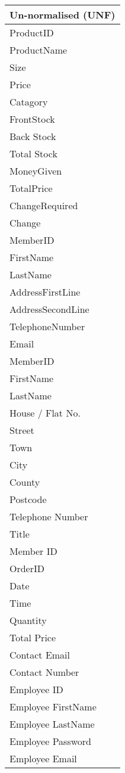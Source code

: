 \begin{center}
    \begin{tabular}{|p{4cm}|}
        \hline
        \textbf{Un-normalised (UNF)}\\ \hline
	{ProductID}\\ \hline
	{ProductName}\\ \hline
	{Size}\\ \hline
	{Price}\\ \hline
	{Catagory}\\ \hline
	{FrontStock}\\ \hline
	{Back Stock}\\ \hline
	{Total Stock}\\ \hline
	{MoneyGiven}\\ \hline
	{TotalPrice}\\ \hline
	{ChangeRequired}\\ \hline
	{Change}\\ \hline
	{MemberID}\\ \hline
	{FirstName}\\ \hline
	{LastName}\\ \hline
	{AddressFirstLine}\\ \hline
	{AddressSecondLine}\\ \hline
	{TelephoneNumber}\\ \hline
	{Email}\\ \hline
	{MemberID}\\ \hline
	{FirstName}\\ \hline
	{LastName}\\ \hline
	{House / Flat No.}\\ \hline
	{Street}\\ \hline
	{Town}\\ \hline
	{City}\\ \hline
	{County}\\ \hline
	{Postcode}\\ \hline
	{Telephone Number}\\ \hline
	{Title}\\ \hline
	{Member ID}\\ \hline
	{OrderID}\\ \hline
	{Date}\\ \hline
	{Time}\\ \hline
	{Quantity}\\ \hline
	{Total Price}\\ \hline
	{Contact Email}\\ \hline
	{Contact Number}\\ \hline
	{Employee ID}\\ \hline
	{Employee FirstName}\\ \hline
	{Employee LastName}\\ \hline
	{Employee Password}\\ \hline
	{Employee Email}\\ \hline
	

\end{tabular}
\end{center}
